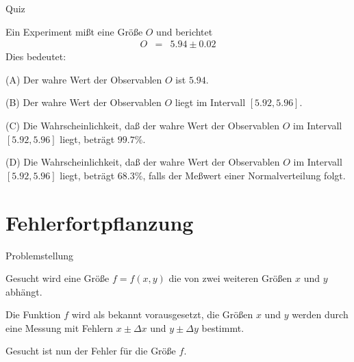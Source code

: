 \documentclass[german]{beamer}
\newcommand{\bq}{\begin{eqnarray*}}
\newcommand{\eq}{\end{eqnarray*}}
\begin{document}
\begin{frame}{Quiz}

Ein Experiment mi{\ss}t eine Gr\"o{\ss}e $O$ und berichtet
\bq
 O & = &
 5.94\pm 0.02
\eq
Dies bedeutet:

\vspace*{5mm}
(A) Der wahre Wert der Observablen $O$ ist $5.94$.

\vspace*{2mm}
(B) Der wahre Wert der Observablen $O$ liegt im Intervall $[5.92,5.96]$.

\vspace*{2mm}
(C) Die Wahrscheinlichkeit, da{\ss} der wahre Wert der Observablen $O$ im Intervall $[5.92,5.96]$ liegt, betr\"agt $99.7\%$.

\vspace*{2mm}
(D) Die Wahrscheinlichkeit, da{\ss} der wahre Wert der Observablen $O$ im Intervall $[5.92,5.96]$ liegt, betr\"agt $68.3\%$,
falls der Me{\ss}wert einer Normalverteilung folgt.

\end{frame}


\section{Fehlerfortpflanzung}

\frame{\sectionpage}

\begin{frame}{Problemstellung}

Gesucht wird eine Gr\"o{\ss}e $f=f(x,y)$ die von zwei weiteren Gr\"o{\ss}en
$x$ und $y$ abh\"angt. 

Die Funktion $f$ wird als bekannt vorausgesetzt, die Gr\"o{\ss}en 
$x$ und $y$ werden durch eine Messung mit Fehlern $x \pm \Delta x$ und $y \pm \Delta y$ bestimmt.

Gesucht ist nun der Fehler f\"ur die Gr\"o{\ss}e $f$.

\end{frame}
\end{document}
